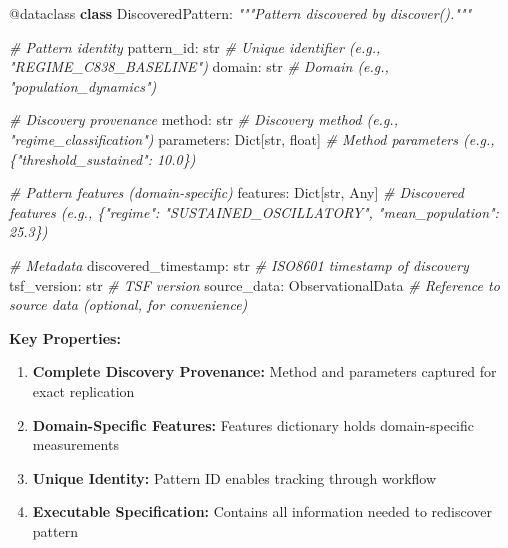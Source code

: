 \documentclass[
]{article}
\newenvironment{Shaded}{}{}
\newcommand{\AttributeTok}[1]{\textcolor[rgb]{0.49,0.56,0.16}{#1}}
\newcommand{\BuiltInTok}[1]{\textcolor[rgb]{0.00,0.50,0.00}{#1}}
\newcommand{\CommentTok}[1]{\textcolor[rgb]{0.38,0.63,0.69}{\textit{#1}}}
\newcommand{\KeywordTok}[1]{\textcolor[rgb]{0.00,0.44,0.13}{\textbf{#1}}}
\newcommand{\NormalTok}[1]{#1}
\providecommand{\tightlist}{%
  \setlength{\itemsep}{0pt}\setlength{\parskip}{0pt}}
\begin{document}
\begin{Shaded}
\begin{Highlighting}[]
\AttributeTok{@dataclass}
\KeywordTok{class}\NormalTok{ DiscoveredPattern:}
    \CommentTok{"""Pattern discovered by discover()."""}

    \CommentTok{\# Pattern identity}
\NormalTok{    pattern\_id: }\BuiltInTok{str}                        \CommentTok{\# Unique identifier (e.g., "REGIME\_C838\_BASELINE")}
\NormalTok{    domain: }\BuiltInTok{str}                            \CommentTok{\# Domain (e.g., "population\_dynamics")}

    \CommentTok{\# Discovery provenance}
\NormalTok{    method: }\BuiltInTok{str}                            \CommentTok{\# Discovery method (e.g., "regime\_classification")}
\NormalTok{    parameters: Dict[}\BuiltInTok{str}\NormalTok{, }\BuiltInTok{float}\NormalTok{]           }\CommentTok{\# Method parameters (e.g., \{"threshold\_sustained": 10.0\})}

    \CommentTok{\# Pattern features (domain{-}specific)}
\NormalTok{    features: Dict[}\BuiltInTok{str}\NormalTok{, Any]               }\CommentTok{\# Discovered features (e.g., \{"regime": "SUSTAINED\_OSCILLATORY", "mean\_population": 25.3\})}

    \CommentTok{\# Metadata}
\NormalTok{    discovered\_timestamp: }\BuiltInTok{str}              \CommentTok{\# ISO8601 timestamp of discovery}
\NormalTok{    tsf\_version: }\BuiltInTok{str}                       \CommentTok{\# TSF version}
\NormalTok{    source\_data: ObservationalData         }\CommentTok{\# Reference to source data (optional, for convenience)}
\end{Highlighting}
\end{Shaded}

\textbf{Key Properties:}

\begin{enumerate}
\def\labelenumi{\arabic{enumi}.}
\tightlist
\item
  \textbf{Complete Discovery Provenance:} Method and parameters captured
  for exact replication
\item
  \textbf{Domain-Specific Features:} Features dictionary holds
  domain-specific measurements
\item
  \textbf{Unique Identity:} Pattern ID enables tracking through workflow
\item
  \textbf{Executable Specification:} Contains all information needed to
  rediscover pattern
\end{enumerate}
\end{document}
